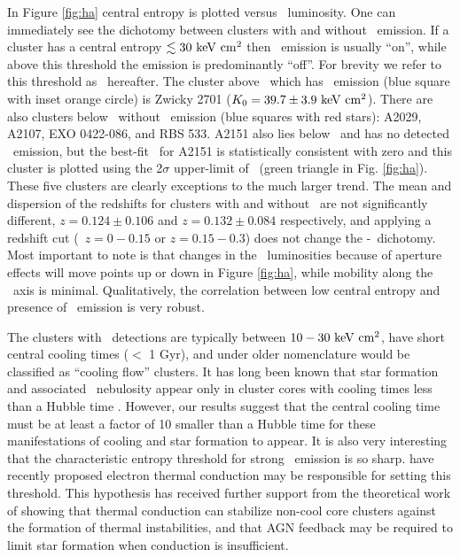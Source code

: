 \documentclass{emulateapj}
\begin{document}
In Figure \ref{fig:ha} central entropy is plotted versus
\halpha\ luminosity. One can immediately see the dichotomy between
clusters with and without \halpha\ emission. If a cluster has a
central entropy $\lesssim 30 \mathrm{\mbox{\ensuremath{\mathrm{~keV}}} \mathrm{\mbox{\ensuremath{\mathrm{~cm}}}^2}}$ then \halpha\ emission is usually
``on'', while above this threshold the emission is predominantly
``off''. For brevity we refer to this threshold as
\kthr\ hereafter. The cluster above \kthr\ which has \halpha\ emission
(blue square with inset orange circle) is Zwicky 2701 ($K_0 = 39.7
\pm 3.9 \mathrm{\mbox{\ensuremath{\mathrm{~keV}}} \mathrm{\mbox{\ensuremath{\mathrm{~cm}}}^2}}$). There are also clusters below \kthr\ without
\halpha\ emission (blue squares with red stars): A2029, A2107, EXO
0422-086, and RBS 533. A2151 also lies below \kthr\ and has no
detected \halpha\ emission, but the best-fit \kna\ for A2151 is
statistically consistent with zero and this cluster is plotted using
the 2$\sigma$ upper-limit of \kna\ (green triangle in
Fig. \ref{fig:ha}).  These five clusters are clearly exceptions to the
much larger trend. The mean and dispersion of the redshifts for
clusters with and without \halpha\ are not significantly different,
$z = 0.124 \pm 0.106$ and $z = 0.132 \pm 0.084$ respectively, and
applying a redshift cut (\ie\ $z = 0-0.15$ or $z = 0.15-0.3$) does not
change the \kna-\halpha\ dichotomy. Most important to note is that
changes in the \halpha\ luminosities because of aperture effects will
move points up or down in Figure \ref{fig:ha}, while mobility along
the \kna\ axis is minimal. Qualitatively, the correlation between low
central entropy and presence of \halpha\ emission is very robust.

The clusters with \halpha\ detections are typically between $10-30
\mathrm{\mbox{\ensuremath{\mathrm{~keV}}} \mathrm{\mbox{\ensuremath{\mathrm{~cm}}}^2}}$, have short central cooling times ($<$ 1 Gyr), and under older
nomenclature would be classified as ``cooling flow'' clusters.  It has
long been known that star formation and associated \halpha\ nebulosity
appear only in cluster cores with cooling times less than a Hubble
time \citep{hu85, johnstone87, mcnamara89, voit97,cardiel98}. However,
our results suggest that the central cooling time must be at least a
factor of 10 smaller than a Hubble time for these manifestations of
cooling and star formation to appear.  It is also very interesting
that the characteristic entropy threshold for strong \halpha\ emission
is so sharp. \cite{conduction} have recently proposed electron thermal
conduction may be responsible for setting this threshold. This
hypothesis has received further support from the theoretical work of
\cite{2008arXiv0804.3823G} showing that thermal conduction can
stabilize non-cool core clusters against the formation of thermal
instabilities, and that AGN feedback may be required to limit star
formation when conduction is insufficient.
\end{document}
